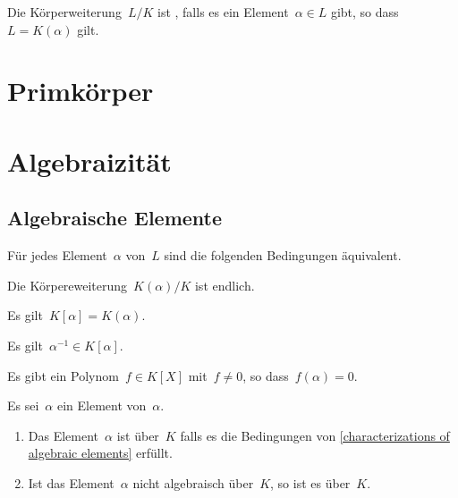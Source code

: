 \begin{definition}
  Die Körperweiterung~$L/K$ ist , falls es ein Element~$\alpha \in L$ gibt, so dass~$L = K(\alpha)$ gilt.
\end{definition}





\section{Primkörper}






\section{Algebraizität}



\subsection{Algebraische Elemente}

\begin{proposition}
  \label{characterizations of algebraic elements}
  Für jedes Element~$\alpha$ von~$L$ sind die folgenden Bedingungen äquivalent.
  \begin{equivlist}
    \item
      Die Körpereweiterung~$K(\alpha)/K$ ist endlich.
    \item
      Es gilt~$K[\alpha] = K(\alpha)$.
    \item
      Es gilt~$\alpha^{-1} \in K[\alpha]$.
    \item
      Es gibt ein Polynom~$f \in K[X]$ mit~$f \neq 0$, so dass~$f(\alpha) = 0$.
  \end{equivlist}
\end{proposition}

\begin{definition}
  Es sei~$\alpha$ ein Element von~$\alpha$.
  \begin{enumerate}
    \item
      Das Element~$\alpha$ ist  über~$K$ falls es die Bedingungen von \cref{characterizations of algebraic elements} erfüllt.
    \item
      Ist das Element~$\alpha$ nicht algebraisch über~$K$, so ist es  über~$K$.
  \end{enumerate}
\end{definition}

